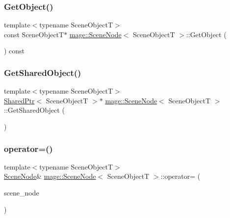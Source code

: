 \subsubsection{\texorpdfstring{Get\+Object()}{GetObject()}\hspace{0.1cm}{\footnotesize\ttfamily [2/2]}}
{\footnotesize\ttfamily template$<$typename Scene\+ObjectT$>$ \\
const Scene\+ObjectT$\ast$ \hyperlink{classmage_1_1_scene_node}{mage\+::\+Scene\+Node}$<$ Scene\+ObjectT $>$\+::Get\+Object (\begin{DoxyParamCaption}{ }\end{DoxyParamCaption}) const}

\hypertarget{classmage_1_1_scene_node_aee3e06bc2c0979f01678ee96149c2607}{}\label{classmage_1_1_scene_node_aee3e06bc2c0979f01678ee96149c2607} 
\subsubsection{\texorpdfstring{Get\+Shared\+Object()}{GetSharedObject()}}
{\footnotesize\ttfamily template$<$typename Scene\+ObjectT$>$ \\
\hyperlink{namespacemage_a1e01ae66713838a7a67d30e44c67703e}{Shared\+Ptr}$<$ Scene\+ObjectT $>$$\ast$ \hyperlink{classmage_1_1_scene_node}{mage\+::\+Scene\+Node}$<$ Scene\+ObjectT $>$\+::Get\+Shared\+Object (\begin{DoxyParamCaption}{ }\end{DoxyParamCaption})}

\hypertarget{classmage_1_1_scene_node_a64c931d2d33ec110575b0a7659c41bdb}{}\label{classmage_1_1_scene_node_a64c931d2d33ec110575b0a7659c41bdb} 
\subsubsection{\texorpdfstring{operator=()}{operator=()}\hspace{0.1cm}{\footnotesize\ttfamily [1/2]}}
{\footnotesize\ttfamily template$<$typename Scene\+ObjectT$>$ \\
\hyperlink{classmage_1_1_scene_node}{Scene\+Node}\& \hyperlink{classmage_1_1_scene_node}{mage\+::\+Scene\+Node}$<$ Scene\+ObjectT $>$\+::operator= (\begin{DoxyParamCaption}\item[{const \hyperlink{classmage_1_1_scene_node}{Scene\+Node}$<$ Scene\+ObjectT $>$ \&}]{scene\+\_\+node }\end{DoxyParamCaption})\hspace{0.3cm}{\ttfamily [delete]}}

